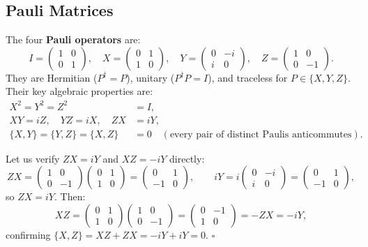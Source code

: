 \documentclass[11pt, a4paper]{article}
\theoremstyle{definition}
\theoremstyle{plain}
\theoremstyle{remark}
\begin{document}
\subsection{Pauli Matrices}

The four \textbf{Pauli operators} are:
\[
  I = \begin{pmatrix}1&0\\0&1\end{pmatrix},\quad
  X = \begin{pmatrix}0&1\\1&0\end{pmatrix},\quad
  Y = \begin{pmatrix}0&-i\\i&0\end{pmatrix},\quad
  Z = \begin{pmatrix}1&0\\0&-1\end{pmatrix}.
\]
They are Hermitian ($P^\dagger = P$), unitary ($P^\dagger P = I$), and
traceless for $P \in \{X,Y,Z\}$.  Their key algebraic properties are:
\begin{align}
  X^2 = Y^2 = Z^2 &= I, \label{eq:pauli-square}\\
  XY = iZ,\quad YZ = iX,\quad ZX &= iY, \label{eq:pauli-product}\\
  \{X,Y\} = \{Y,Z\} = \{X,Z\} &= 0 \quad
  (\text{every pair of distinct Paulis anticommutes}).
  \label{eq:anticommute}
\end{align}

\begin{workedexample}
Let us verify $ZX = iY$ and $XZ = -iY$ directly:
\[
  ZX = \begin{pmatrix}1&0\\0&-1\end{pmatrix}\begin{pmatrix}0&1\\1&0\end{pmatrix}
     = \begin{pmatrix}0&1\\-1&0\end{pmatrix},
\qquad
  iY = i\begin{pmatrix}0&-i\\i&0\end{pmatrix}
     = \begin{pmatrix}0&1\\-1&0\end{pmatrix},
\]
so $ZX = iY$.  Then:
\[
  XZ = \begin{pmatrix}0&1\\1&0\end{pmatrix}\begin{pmatrix}1&0\\0&-1\end{pmatrix}
     = \begin{pmatrix}0&-1\\1&0\end{pmatrix} = -ZX = -iY,
\]
confirming $\{X,Z\} = XZ + ZX = -iY + iY = 0$. \hfill$\square$
\end{workedexample}
\end{document}
